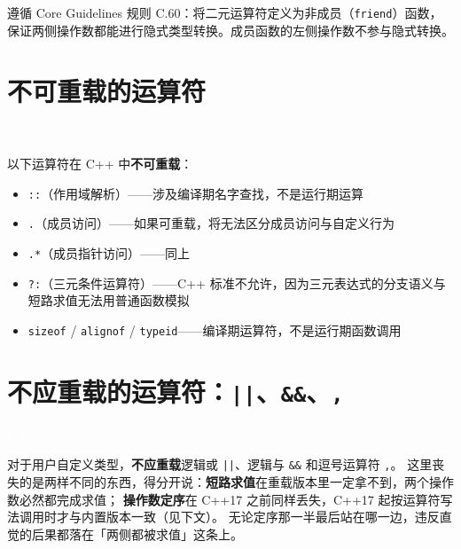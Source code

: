 \documentclass[12pt,a4paper,fontset=fandol]{ctexbook}
\newcommand{\cpp}[1]{C++#1}
\newcommand{\cpplabel}{%
  \noindent\begin{tcolorbox}[sharp corners,colback=algheadbg,colframe=algheadbg,
    left=6pt,right=6pt,top=2pt,bottom=2pt,boxrule=0pt]
  \textcolor{white}{\small\bfseries\sffamily C++}\end{tcolorbox}%
}
\begin{document}
\begin{note}[title=二元运算符应为非成员]
遵循 Core Guidelines 规则 C.60：将二元运算符定义为非成员（\texttt{friend}）函数，保证两侧操作数都能进行隐式类型转换。成员函数的左侧操作数不参与隐式转换。
\end{note}

\section{不可重载的运算符}

\cpplabel

以下运算符在 \cpp{} 中\textbf{不可重载}：

\begin{itemize}
  \item \texttt{::}（作用域解析）——涉及编译期名字查找，不是运行期运算
  \item \texttt{.}（成员访问）——如果可重载，将无法区分成员访问与自定义行为
  \item \texttt{.*}（成员指针访问）——同上
  \item \texttt{?:}（三元条件运算符）——\cpp{} 标准不允许，因为三元表达式的分支语义与短路求值无法用普通函数模拟
  \item \texttt{sizeof} / \texttt{alignof} / \texttt{typeid}——编译期运算符，不是运行期函数调用
\end{itemize}

\section{不应重载的运算符：\texttt{||}、\texttt{\&\&}、\texttt{,}}

\cpplabel

\begin{warning}[title={规则 C.65 延伸：不重载 \texttt{||}、\texttt{\&\&}、\texttt{,}}]
对于用户自定义类型，\textbf{不应重载}逻辑或 \texttt{||}、逻辑与 \texttt{\&\&} 和逗号运算符 \texttt{,}。
这里丧失的是两样不同的东西，得分开说：\textbf{短路求值}在重载版本里一定拿不到，两个操作数必然都完成求值；
\textbf{操作数定序}在 \cpp{17} 之前同样丢失，\cpp{17} 起按运算符写法调用时才与内置版本一致（见下文）。
无论定序那一半最后站在哪一边，违反直觉的后果都落在「两侧都被求值」这条上。
\end{warning}
\end{document}
